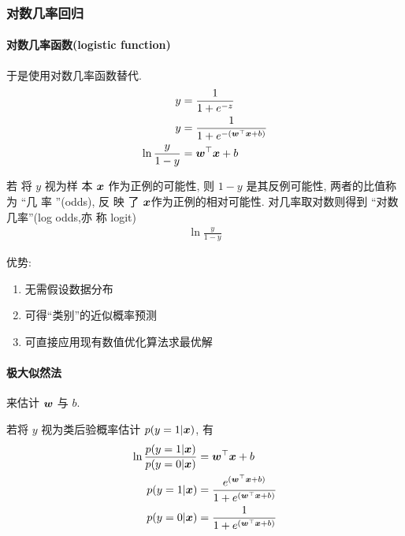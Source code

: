 \subsubsection{对数几率回归}


\paragraph{对数几率函数(logistic function)} 于是使用对数几率函数替代. 
\begin{align*}
    y&=\frac{1}{1+e^{-z}}\\
    y&=\frac{1}{1+e^{-(\bm{w}^\top\bm{x}+b)}}\\
    \ln\frac{y}{1-y}&=\bm{w}^\top\bm{x}+b
\end{align*}


\begin{definition}
    若 将 $y$ 视为样 本 $\bm{x}$ 作为正例的可能性, 则 $1 - y$ 是其反例可能性, 两者的比值称 为 ``几 率 ''(odds), 反 映 了 $\bm{x}$作为正例的相对可能性. 对几率取对数则得到 ``对数几率''(log odds,亦 称 logit)
    \begin{align*}
        \ln\frac{y}{1-y}
    \end{align*}
\end{definition}

优势:
\begin{enumerate}
    \item 无需假设数据分布
    \item 可得``类别''的近似概率预测
    \item 可直接应用现有数值优化算法求最优解
\end{enumerate}

\paragraph{极大似然法}来估计 $\bm{w}$ 与 $b$. 

若将 $y$ 视为类后验概率估计 $p(y = 1 | \bm{x})$, 有 
\begin{align*}
    \ln\frac{p(y = 1 | \bm{x})}{p(y = 0 | \bm{x})}&=\bm{w}^\top \bm{x}+b\\
    p(y = 1 | \bm{x})&=\frac{e^{(\bm{w}^\top\bm{x}+b)}}{1+e^{(\bm{w}^\top\bm{x}+b)}}\\
    p(y = 0 | \bm{x})&=\frac{1}{1+e^{(\bm{w}^\top\bm{x}+b)}}\\
\end{align*}

